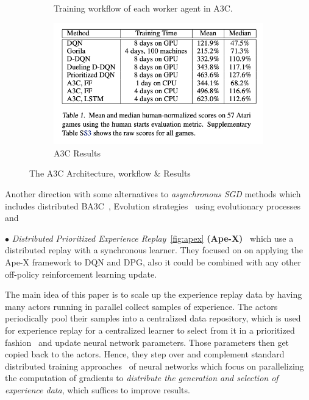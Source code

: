 \begin{figure}[H]
\begin{subfigure}[b]{0.3\textwidth}
		\caption{Training workflow of each worker agent in A3C.}
		\label{fig:a3c_workflow}
    \end{subfigure}
    \hfill
	\begin{subfigure}[b]{0.3\textwidth}
		\centering
		\includegraphics[width=\textwidth]{figures/algos/a3c_results.png}
        \caption{A3C Results}
		\label{fig:a3c_results}
	\end{subfigure}
	\hfill
	   \caption{The A3C Architecture, workflow \& Results}
	   \label{fig:a3c}
\end{figure}

Another direction with some alternatives to \textit{asynchronous SGD} methods which includes distributed BA3C~\parencite{adamski2018distributed}, Evolution strategies~\parencite{salimans2017evolution} using evolutionary processes and 

$\bullet$ \textit{Distributed Prioritized Experience Replay}~\ref{fig:apex} \textbf{(Ape-X)}~\parencite{horgan2018distributed} which use a distributed replay with a synchronous learner. They focused on on applying the Ape-X framework to DQN and DPG, also it could  be combined with any other off-policy reinforcement learning update. 

The main idea of this paper is to scale up the experience replay data by having many actors running in parallel  collect samples of experience. The actors periodically pool their samples into a centralized data repository, which is used for experience replay for a centralized learner to select from it in a prioritized fashion~\parencite{schaul2015prioritized} and update neural network parameters. Those parameters then get copied back to the actors. Hence, they step over and complement standard distributed training approaches~\parencite{dean2012large} of neural networks which focus on parallelizing the computation of gradients to \textit{distribute the generation and selection of experience data}, which suffices to improve results.

